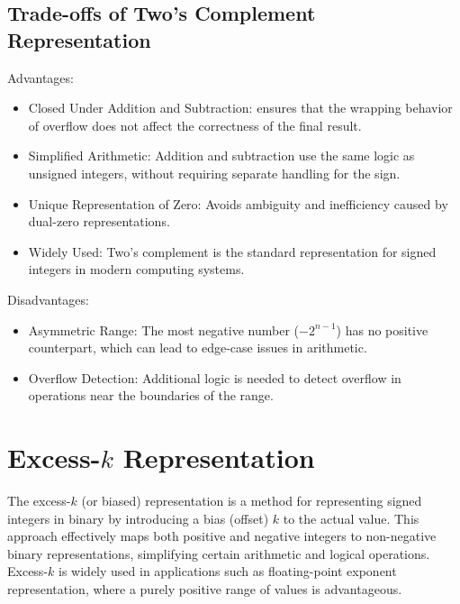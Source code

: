 \subsection{Trade-offs of Two's Complement Representation}
Advantages:
\begin{itemize}
    \item Closed Under Addition and Subtraction: ensures that the wrapping behavior of overflow does not affect the correctness of the final result.
    \item Simplified Arithmetic: Addition and subtraction use the same logic as unsigned integers, without requiring separate handling for the sign.
    \item Unique Representation of Zero: Avoids ambiguity and inefficiency caused by dual-zero representations.
    \item Widely Used: Two's complement is the standard representation for signed integers in modern computing systems.
\end{itemize}

Disadvantages:
\begin{itemize}
    \item Asymmetric Range: The most negative number (\( -2^{n-1} \)) has no positive counterpart, which can lead to edge-case issues in arithmetic.
    \item Overflow Detection: Additional logic is needed to detect overflow in operations near the boundaries of the range.
\end{itemize}


\section{Excess-\( k \) Representation}
The excess-\( k \) (or biased) representation is a method for representing signed integers in binary by introducing a bias (offset) \( k \) to the actual value. This approach effectively maps both positive and negative integers to non-negative binary representations, simplifying certain arithmetic and logical operations. Excess-\( k \) is widely used in applications such as floating-point exponent representation, where a purely positive range of values is advantageous.

